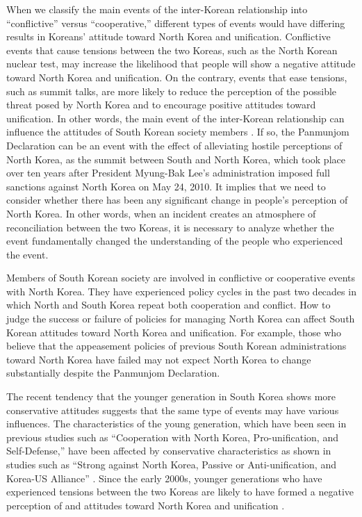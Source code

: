 \documentclass[letterpaper,9pt,twocolumn,twoside,]{pinp}
\begin{document}
When we classify the main events of the inter-Korean relationship into
``conflictive'' versus ``cooperative,'' different types of events would
have differing results in Koreans' attitude toward North Korea and
unification. Conflictive events that cause tensions between the two
Koreas, such as the North Korean nuclear test, may increase the
likelihood that people will show a negative attitude toward North Korea
and unification. On the contrary, events that ease tensions, such as
summit talks, are more likely to reduce the perception of the possible
threat posed by North Korea and to encourage positive attitudes toward
unification. In other words, the main event of the inter-Korean
relationship can influence the attitudes of South Korean society members
\citep[160-161, 171]{Kim2017}. If so, the Panmunjom Declaration can be
an event with the effect of alleviating hostile perceptions of North
Korea, as the summit between South and North Korea, which took place
over ten years after President Myung-Bak Lee's administration imposed
full sanctions against North Korea on May 24, 2010. It implies that we
need to consider whether there has been any significant change in
people's perception of North Korea. In other words, when an incident
creates an atmosphere of reconciliation between the two Koreas, it is
necessary to analyze whether the event fundamentally changed the
understanding of the people who experienced the event.

Members of South Korean society are involved in conflictive or
cooperative events with North Korea. They have experienced policy cycles
in the past two decades in which North and South Korea repeat both
cooperation and conflict. How to judge the success or failure of
policies for managing North Korea can affect South Korean attitudes
toward North Korea and unification. For example, those who believe that
the appeasement policies of previous South Korean administrations toward
North Korea have failed may not expect North Korea to change
substantially despite the Panmunjom Declaration.

The recent tendency that the younger generation in South Korea shows
more conservative attitudes suggests that the same type of events may
have various influences. The characteristics of the young generation,
which have been seen in previous studies such as ``Cooperation with
North Korea, Pro-unification, and Self-Defense,'' have been affected by
conservative characteristics as shown in studies such as ``Strong
against North Korea, Passive or Anti-unification, and Korea-US
Alliance'' \citep{Bae2018}. Since the early 2000s, younger generations
who have experienced tensions between the two Koreas are likely to have
formed a negative perception of and attitudes toward North Korea and
unification \citep{Hur2014}.
\end{document}
